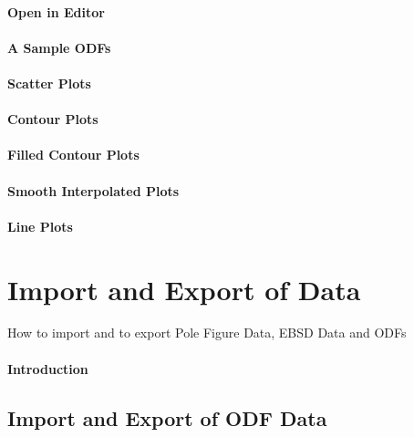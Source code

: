 \documentclass{article}
\begin{document}
                  
			\paragraph{Open in Editor}
		
			\paragraph{A Sample ODFs}
		
			\paragraph{Scatter Plots}
		
			\paragraph{Contour Plots}
		
			\paragraph{Filled Contour Plots}
		
			\paragraph{Smooth Interpolated Plots}
		
			\paragraph{Line Plots}
		
		\section{Import and Export of Data}

		
                  \begin{par}
How to import and to export Pole Figure Data, EBSD Data and ODFs
\end{par} \vspace{1em}

               
			\paragraph{Introduction}
		
		\subsection{Import and Export of ODF Data}
\end{document}
